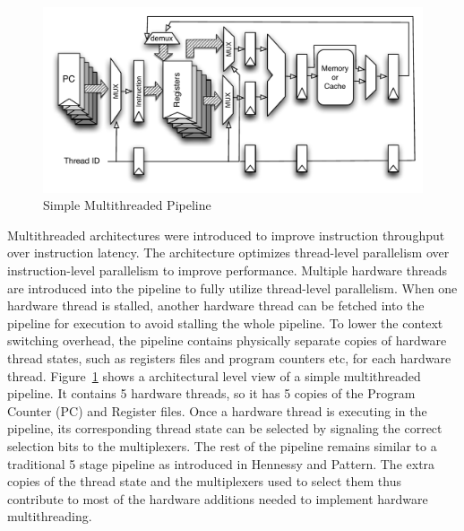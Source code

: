 \begin{figure}
\begin{center}
\includegraphics[scale=.8]{figs/multithreaded_pipeline_block}
\end{center}
\vspace{-30pt}
\caption{Simple Multithreaded Pipeline}
\label{fig:multi-thread pipeline simplified}
\end{figure}
Multithreaded architectures were introduced to improve instruction throughput over instruction latency.
The architecture optimizes thread-level parallelism over instruction-level parallelism to improve performance.
Multiple hardware threads are introduced into the pipeline to fully utilize thread-level parallelism. 
When one hardware thread is stalled, another hardware thread can be fetched into the pipeline for execution to avoid stalling the whole pipeline. 
To lower the context switching overhead, the pipeline contains physically separate copies of hardware thread states, such as registers files and program counters etc, for each hardware thread.
Figure~\ref{fig:multi-thread pipeline simplified} shows a architectural level view of a simple multithreaded pipeline.
It contains 5 hardware threads, so it has 5 copies of the Program Counter (PC) and Register files.
Once a hardware thread is executing in the pipeline, its corresponding thread state can be selected by signaling the correct selection bits to the multiplexers.
The rest of the pipeline remains similar to a traditional 5 stage pipeline as introduced in Hennessy and Pattern.   
The extra copies of the thread state and the multiplexers used to select them thus contribute to most of the hardware additions needed to implement hardware multithreading.

